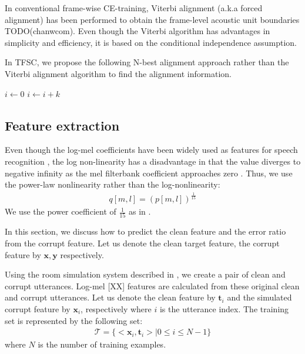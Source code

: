 \documentclass{article}
\begin{document}
In conventional frame-wise CE-training, Viterbi alignment 
(a.k.a forced alignment) has been performed to obtain the frame-level 
acoustic unit  boundaries TODO(chanwcom). Even though the Viterbi algorithm
has advantages in simplicity and efficiency, it is based on
the conditional independence assumption.

In TFSC, we propose the following N-best alignment approach rather than
the Viterbi alignment algorithm to find the alignment information.

\begin{algorithmic}

	\EndFor
\EndFor

    \State $i\gets 0$
\Else
        \State $i\gets i+k$
    \EndIf
\EndIf
\label{algorithm:n_best_alignment}
\end{algorithmic}




\subsection{Feature extraction}

Even though the log-mel coefficients have been widely used
as features for speech recognition \cite{sbdavisandpm1980},
the log non-linearity has a disadvantage in that the value
diverges to negative infinity as the mel filterbank coefficient
approaches zero \cite{C_Kim_IEEETran_2016_1}.
Thus, we use the power-law nonlinearity
rather than the log-nonlinearity:
\begin{align}
  q[m, l] =  (p[m, l])^{\frac{1}{15}}
  \label{eq:power_law_nonlineartiy}
\end{align}
We use the power coefficient of $\frac{1}{15}$ as in
\cite{C_Kim_IEEETran_2016_1, C_Kim_ICASSP_2012_1}.



In this section, we discuss how to predict the clean feature and the
error ratio from the corrupt feature. Let us denote the clean target feature,
the corrupt feature by $\boldsymbol{x}, \boldsymbol{y}$ respectively.

Using the room simulation system described in \cite{C_Kim_INTERSPEECH_2017_1},
we create a pair of clean and
corrupt utterances. Log-mel [XX] features are calculated from these original clean
and corrupt utterances. Let us denote the clean feature by $\boldsymbol{t}_i$ and
the simulated corrupt feature by $\boldsymbol{x}_i$, respectively where $i$ is the
utterance index. The training set is represented by the following set:
\begin{align}
  \mathcal{T} = \{<\boldsymbol{x}_i, \boldsymbol{t}_i>| 0 \le i \le N - 1\}
\end{align}
where $N$ is the number of training examples.
\end{document}
